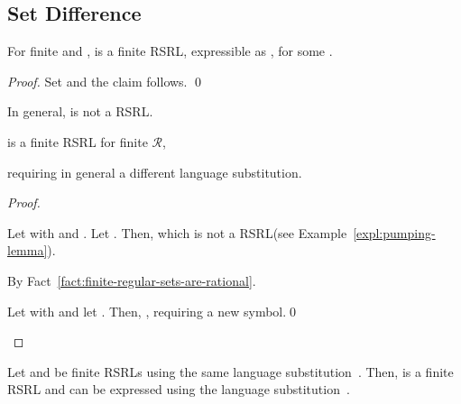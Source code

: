 \documentclass[envcountsame]{llncs}
\newcommand{\rationalset}{\ensuremath{\mathcal{R}}\xspace}
\newcommand{\RegularlyGeneratedLanguageSetAbbrev}{RSRL\xspace}
\newcommand{\RegularlyGeneratedLanguageSetsAbbrev}{RSRLs\xspace}
\begin{document}
\subsection{Set Difference}
\label{sec:set-difference}




\begin{proposition}
  \label{prop:closure:difference}
For finite 
    and ,  is a
    finite \RegularlyGeneratedLanguageSetAbbrev, expressible as , for some
    .
\end{proposition}

\begin{proof}
Set  and
    the claim follows. \qed
\end{proof}


\begin{proposition}
  \label{prop:closure:pw-difference}
  \begin{inparaenum}
  \item\label{prop:closure:pw-difference:a} In general,  is not a \RegularlyGeneratedLanguageSetAbbrev.
  \item\label{prop:closure:pw-difference:b} 
    is a finite \RegularlyGeneratedLanguageSetAbbrev for finite \rationalset, 
  \item\label{prop:closure:pw-difference:c} requiring in general a
    different language substitution.
  \end{inparaenum}
\end{proposition}

\begin{proof}
  \begin{inparaenum}[\bfseries(1)]
  \item Let  with
     and .  Let .  Then,  which is
    not a \RegularlyGeneratedLanguageSetAbbrev (see Example~\ref{expl:pumping-lemma}).
  \item By Fact~\ref{fact:finite-regular-sets-are-rational}.
  \item Let  with
     and let .  Then,
    , requiring a new
    symbol.\qed
	\end{inparaenum}
\end{proof}





\begin{proposition}
  \label{prop:closure:sym-difference}
Let  and
     be finite \RegularlyGeneratedLanguageSetsAbbrev using the same language
    substitution~.  Then,
     is a finite \RegularlyGeneratedLanguageSetAbbrev and
    can be expressed using the language substitution~.
\end{proposition}
\end{document}

